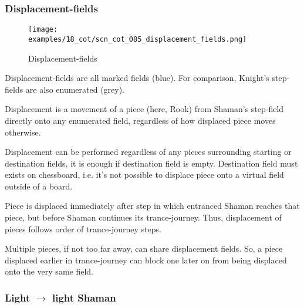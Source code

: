 
\subsubsection*{Displacement-fields}
\label{sec:Conquest of Tlalocan/Trance-journey/Interactions/Displacement-fields}

\vspace*{-1.5\baselineskip}
\noindent
\begin{figure}[!h]
\texttt{[image: examples/18\_cot/scn\_cot\_085\_displacement\_fields.png]}
\caption{Displacement-fields}
\label{fig:scn_cot_085_displacement_fields}
\end{figure}

Displacement-fields are all marked fields (blue). For comparison, Knight's
step-fields are also enumerated (grey).

Displacement is a movement of a piece (here, Rook) from Shaman's step-field directly
onto any enumerated field, regardless of how displaced piece moves otherwise.

Displacement can be performed regardless of any pieces surrounding starting or
destination fields, it is enough if destination field is empty. Destination field
must exists on chessboard, i.e. it's not possible to displace piece onto a virtual
field outside of a board.

Piece is displaced immediately after step in which entranced Shaman reaches that
piece, but before Shaman continues its trance-journey. Thus, displacement of pieces
follows order of trance-journey steps.

Multiple pieces, if not too far away, can share displacement fields. So, a piece
displaced earlier in trance-journey can block one later on from being displaced
onto the very same field.

\clearpage %

\subsubsection*{Light $\rightarrow$ light Shaman}
\label{sec:Conquest of Tlalocan/Trance-journey/Interactions/Light --> light Shaman}


